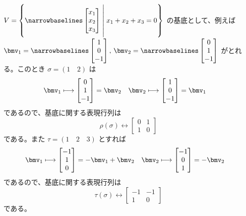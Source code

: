\documentclass[a4paper]{ltjsarticle}
\begin{document}
\begin{exm}
  $V = \left\{\nbl\begin{bmatrix}
    x_1\\ x_2\\ x_3
  \end{bmatrix}\cvert{4}x_1 + x_2 + x_3 = 0\right\}$ の基底として、例えば $\bmv_1 = \nbl\begin{bmatrix}
    1\\ 0\\ -1
  \end{bmatrix},\,\bmv_2 = \nbl\begin{bmatrix}
    0\\ 1\\ -1
  \end{bmatrix}$ がとれる。このとき $\sigma = (1\quad 2)$ は
  \begin{align}
    &\bmv_1\longmapsto\begin{bmatrix}
      0\\ 1\\ -1
    \end{bmatrix} = \bmv_2&&\bmv_2\longmapsto\begin{bmatrix}
      1\\ 0\\ -1
    \end{bmatrix} = \bmv_1
  \end{align}
  であるので、基底に関する表現行列は
  \begin{equation}
    \rho(\sigma) \longleftrightarrow \begin{bmatrix}
      0&1\\ 1&0
    \end{bmatrix}
  \end{equation}
  である。また $\tau = (1\quad 2\quad 3)$ とすれば
  \begin{align}
    &\bmv_1\longmapsto\begin{bmatrix}
      -1\\ 1\\ 0
    \end{bmatrix} = -\bmv_1 + \bmv_2&&\bmv_2\longmapsto\begin{bmatrix}
      -1\\ 0\\ 1
    \end{bmatrix} = -\bmv_2
  \end{align}
  であるので、基底に関する表現行列は
  \begin{equation}
    \tau(\sigma)\longleftrightarrow\begin{bmatrix}
      -1&-1\\ 1&0
    \end{bmatrix}
  \end{equation}
  である。
\end{exm}
\end{document}

